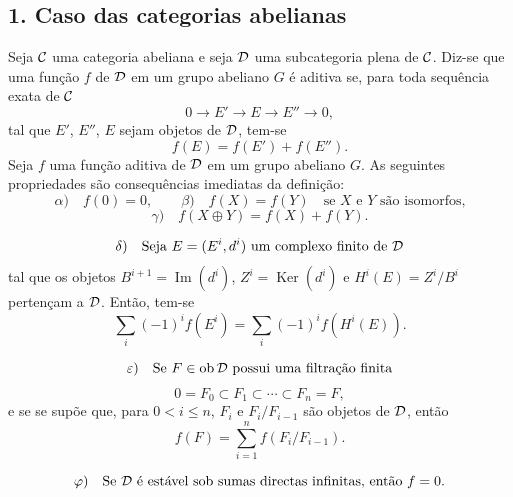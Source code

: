 \subsection*{1. Caso das categorias abelianas}

Seja $\mathcal C$ uma categoria abeliana e seja $\mathcal D$ uma subcategoria plena de $\mathcal C$. Diz-se que uma função $f$ de $\mathcal D$ em um grupo abeliano $G$ é aditiva se, para toda sequência exata de $\mathcal C$
\[
0\longrightarrow E'\longrightarrow E\longrightarrow E''\longrightarrow 0,
\]
tal que $E'$, $E''$, $E$ sejam objetos de $\mathcal D$, tem-se
\[
f(E)=f(E')+f(E'').
\]
Seja $f$ uma função aditiva de $\mathcal D$ em um grupo abeliano $G$. As seguintes propriedades são consequências imediatas da definição:
\[
\alpha)\quad f(0)=0,\qquad
\beta)\quad f(X)=f(Y)\quad\text{se }X\text{ e }Y\text{ são isomorfos,}
\]
\[
\gamma)\quad f(X\oplus Y)=f(X)+f(Y).
\]

\[
\delta)\quad
\text{Seja }E=(E^i,d^i)\text{ um complexo finito de }\mathcal D
\]
tal que os objetos $B^{i+1}=\operatorname{Im}(d^i)$, $Z^i=\operatorname{Ker}(d^i)$ e $H^i(E)=Z^i/B^i$ pertençam a $\mathcal D$. Então, tem-se
\[
\sum_i (-1)^i f(E^i)=\sum_i (-1)^i f(H^i(E)).
\]

\[
\varepsilon)\quad
\text{Se }F\in\operatorname{ob} \mathcal D\text{ possui uma filtração finita}
\]
\[
0=F_0\subset F_1\subset\cdots\subset F_n=F,
\]
e se se supõe que, para $0<i\le n$, $F_i$ e $F_i/F_{i-1}$ são objetos de $\mathcal D$, então
\[
f(F)=\sum_{i=1}^n f(F_i/F_{i-1}).
\]

\[
\varphi)\quad
\text{Se }\mathcal D\text{ é estável sob sumas directas infinitas, então }f=0.
\]
